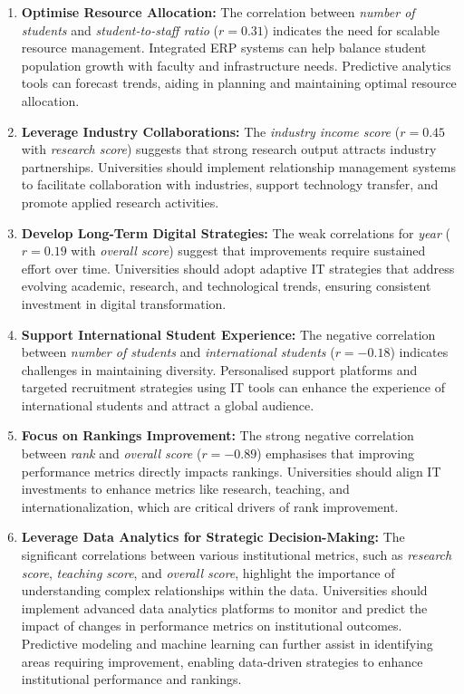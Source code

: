 \documentclass[conference]{IEEEtran}
\begin{document}
\begin{enumerate}
	\item \textbf{Optimise Resource Allocation:} The correlation between \textit{number of students} and \textit{student-to-staff ratio} (\(r = 0.31\)) indicates the need for scalable resource management. Integrated ERP systems can help balance student population growth with faculty and infrastructure needs. Predictive analytics tools can forecast trends, aiding in planning and maintaining optimal resource allocation.
	
	\item \textbf{Leverage Industry Collaborations:} The \textit{industry income score} (\(r = 0.45\) with \textit{research score}) suggests that strong research output attracts industry partnerships. Universities should implement relationship management systems to facilitate collaboration with industries, support technology transfer, and promote applied research activities.
	
	\item \textbf{Develop Long-Term Digital Strategies:} The weak correlations for \textit{year} (\(r = 0.19\) with \textit{overall score}) suggest that improvements require sustained effort over time. Universities should adopt adaptive IT strategies that address evolving academic, research, and technological trends, ensuring consistent investment in digital transformation.
	
	\item \textbf{Support International Student Experience:} The negative correlation between \textit{number of students} and \textit{international students} (\(r = -0.18\)) indicates challenges in maintaining diversity. Personalised support platforms and targeted recruitment strategies using IT tools can enhance the experience of international students and attract a global audience.
	
	\item \textbf{Focus on Rankings Improvement:} The strong negative correlation between \textit{rank} and \textit{overall score} (\(r = -0.89\)) emphasises that improving performance metrics directly impacts rankings. Universities should align IT investments to enhance metrics like research, teaching, and internationalization, which are critical drivers of rank improvement.
	
	\item \textbf{Leverage Data Analytics for Strategic Decision-Making:} The significant correlations between various institutional metrics, such as \textit{research score}, \textit{teaching score}, and \textit{overall score}, highlight the importance of understanding complex relationships within the data. Universities should implement advanced data analytics platforms to monitor and predict the impact of changes in performance metrics on institutional outcomes. Predictive modeling and machine learning can further assist in identifying areas requiring improvement, enabling data-driven strategies to enhance institutional performance and rankings.
	
\end{enumerate}
\end{document}
